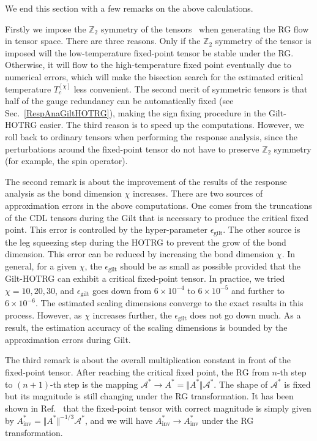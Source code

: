 \documentclass[aps,prb,reprint,superscriptaddress]{revtex4-2}
\begin{document}
We end this section with a few remarks on the above calculations. 
%

Firstly we impose the $\mathbb{Z}_2$ symmetry of the
tensors~\cite{Singh2010SymTen, Singh2011U1Ten} when generating the RG
flow in tensor space. There are three reasons. Only if the
$\mathbb{Z}_2$ symmetry of the tensor is imposed will the
low-temperature fixed-point tensor be stable under the RG.  Otherwise, it
will flow to the high-temperature fixed point eventually due to
numerical errors, which will make the bisection search for the estimated
critical temperature $T_c^{[\chi]}$ less convenient. The second merit of
symmetric tensors is that half of the gauge redundancy can be
automatically fixed (see Sec.~\ref{RespAnaGiltHOTRG}), making the sign
fixing procedure in the Gilt-HOTRG easier. The third reason is to speed up
the computations. However, we roll back to ordinary tensors when
performing the response analysis, since the perturbations around the
fixed-point tensor do not have to preserve $\mathbb{Z}_2$ symmetry (for
example, the spin operator). 
%

The second remark is about the improvement of the results of the response
analysis as the bond dimension $\chi$ increases. There are two sources
of approximation errors in the above computations. One comes from the
truncations of the CDL tensors during the Gilt that is necessary to
produce the critical fixed point. This error is controlled by the
hyper-parameter $\epsilon_{\text{gilt}}$. The other source is the leg
squeezing step during the HOTRG to prevent the grow of the bond dimension.
This error can be reduced by increasing the bond dimension $\chi$. In
general, for a given $\chi$, the $\epsilon_{\text{gilt}}$ should be as small
as possible provided that the Gilt-HOTRG can exhibit a critical fixed-point
tensor. In practice, we tried $\chi = 10, 20, 30$, and
$\epsilon_{\text{gilt}}$ goes down from $6\times 10^{-4}$ to
$6\times10^{-5}$ and further to $6\times10^{-6}$.  The estimated scaling
dimensions converge to the exact results in this process. However, as
$\chi$ increases further, the $\epsilon_{\text{gilt}}$ does not go down
much. As a result, the estimation accuracy of the scaling dimensions is
bounded by the approximation errors during Gilt. 
%

The third remark is about the overall multiplication constant in front
of the fixed-point tensor. After reaching the critical fixed point, the
RG from $n$-th step to $(n+1)$-th step is the mapping
$\mathcal{A}^{*}\rightarrow A^{*} = \Vert A^{*} \Vert
\mathcal{A}^{*}$. The shape of $\mathcal{A}^*$ is fixed but its
magnitude is still changing under the RG transformation. It has been shown
in Ref.~\cite{GuWen2009} that the fixed-point tensor with correct
magnitude is simply given by $A^*_{\text{inv}} = \Vert A^* \Vert^{-1/3}
\mathcal{A}^*$, and we will have $A^*_{\text{inv}}\rightarrow
A^*_{\text{inv}}$ under the RG transformation.
%
\end{document}
